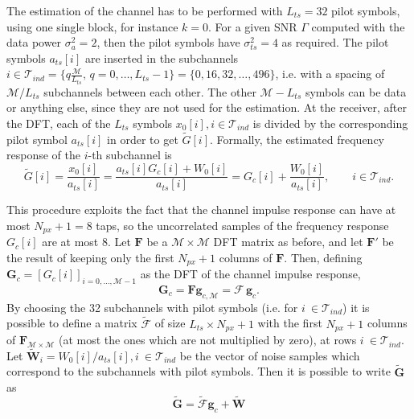 \documentclass[10pt]{article}
\newcommand{\ofdM} {\mathcal{M}}
\newcommand{\DFTmat} {\mathcal{\mathbf{F}}}
\begin{document}
The estimation of the channel has to be performed with $L_{ts} = 32$ pilot symbols, using one single block, for instance $k=0$. For a given SNR $\Gamma$ computed with the data power $\sigma_a^2 = 2$, then the pilot symbols have $\sigma_{ts}^2 = 4$ as required. The pilot symbols $a_{ts}[i]$ are inserted in the subchannels $i \in \mathcal{T}_{ind} = \{q \frac{\ofdM}{L_{ts}}, \, q = 0,\ldots,L_{ts}-1 \}  = \{ 0, 16, 32, \dots, 496 \}$, i.e. with a spacing of $\ofdM/L_{ts}$ subchannels between each other. The other $\ofdM - L_{ts}$ symbols can be data or anything else, since they are not used for the estimation. At the receiver, after the DFT, each of the $L_{ts}$ symbols $x_0[i], i \in \mathcal{T}_{ind}$ is divided by the corresponding pilot symbol $a_{ts}[i]$ in order to get $\tilde{G}[i]$. Formally, the estimated frequency response of the $i$-th subchannel is
\begin{equation}
	\tilde{G}[i] = \dfrac{x_0[i]}{a_{ts}[i]} = \dfrac{a_{ts}[i] G_c[i] + W_0[i]}{a_{ts}[i]} = G_c[i] + \dfrac{W_0[i]}{a_{ts}[i]}, \qquad i \in \mathcal{T}_{ind}.
\end{equation}

This procedure exploits the fact that the channel impulse response can have at most $N_{px} + 1 = 8$ taps, so the uncorrelated samples of the frequency response $G_c[i]$ are at most 8. Let $\DFTmat$ be a $\ofdM \times \ofdM$ DFT matrix as before, and let $\DFTmat'$ be the result of keeping only the first $N_{px}+1$ columns of $\DFTmat$. Then, defining $\mathbf{G}_c = [ G_c[i] ]_{i = 0,\ldots,\ofdM-1}$ as the DFT of the channel impulse response,
\begin{equation}
	\mathbf{G}_c = \DFTmat \mathbf{g}_{c,\ofdM} = \boldsymbol{\mathcal{F}} \, \mathbf{g}_c.
\end{equation}
By choosing the 32 subchannels with pilot symbols (i.e. for $ i\ \in \mathcal{T}_{ind}$) it is possible to define a matrix $\boldsymbol{\tilde{\mathcal{F}}}$ of size $L_{ts} \times N_{px} + 1$ with the first $N_{px} + 1$ columns of $\DFTmat_{\ofdM \times \ofdM}$ (at most the ones which are not multiplied by zero), at rows $ i\ \in \mathcal{T}_{ind} $. Let $\tilde{\mathbf{W}}_i = W_0[i]/a_{ts}[i], i\ \in \mathcal{T}_{ind}$ be the vector of noise samples which correspond to the subchannels with pilot symbols. Then it is possible to write $\mathbf{\tilde{G}}$ as
\begin{equation}
	\mathbf{\tilde{G}} = \boldsymbol{\tilde{\mathcal{F}}}\mathbf{g}_{c} + \tilde{\mathbf{W}}
\end{equation}
\end{document}
